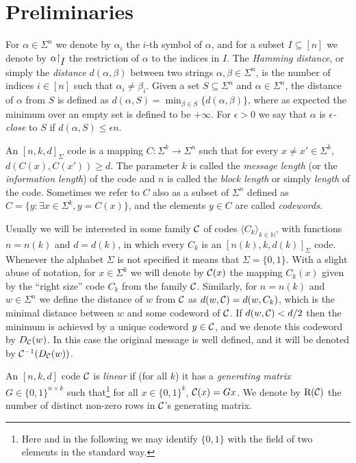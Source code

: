 \documentclass[10pt]{article}
\theoremstyle{definition}
\numberwithin{equation}{section}
\newcommand{\naturals}{{\mathbb N}}
\newcommand{\CC}{{\cal C}}
\newcommand{\zo}{{\{0,1\}}}
\newcommand{\DEC}{{D_{\cal C}}}
\newcommand{\drows}{{{\mathrm{R}} }}
\newcommand{\rst}[1]{\ensuremath{{\mathbin\upharpoonright}%
\raise-.9ex\hbox{$#1$}}}
\begin{document}
\section{Preliminaries}

For $\alpha \in \Sigma^n$ we denote by $\alpha_i$ the 
%
$i$-th 
symbol of $\alpha$, and for a subset $I \subseteq [n]$ we denote by $\alpha\rst{I}$ the restriction of $\alpha$ to the indices in $I$.
The \emph{Hamming distance}, or simply the \emph{distance} $d(\alpha,\beta)$ between two strings $\alpha,\beta \in \Sigma^n$, is the number of indices $i \in [n]$ such that
$\alpha_i \ne \beta_i$. Given a set $S \subseteq \Sigma^n$ and $\alpha \in \Sigma^n$, the distance of $\alpha$ from $S$ is defined as $d(\alpha,S) = \min_{\beta \in S} \{d(\alpha,\beta)\}$, where as expected the minimum over an empty set is defined to be $+\infty$. For $\epsilon >0$ we say that $\alpha$ is \emph{$\epsilon$-close} to $S$ if $d(\alpha,S) \leq \epsilon n$.

An $[n,k,d]_\Sigma$ code is a mapping $C:\Sigma^k \to \Sigma^n$ such that
for every $x \ne x' \in \Sigma^k$, $d(C(x),C(x')) \geq d$. The
parameter $k$ is called the \emph{message length} (or the
\emph{information length}) of the code and $n$ is called the
\emph{block length} or simply \emph{length} of the code. Sometimes we
refer to $C$ also as a subset of $\Sigma^n$ defined as $C = \{y:
\exists x \in \Sigma^k, y=C(x)\}$, and the elements $y \in C$ are called \emph{codewords}.

Usually we will be interested in some family $\CC$ of codes $\langle C_k \rangle_{k \in \naturals}$, with functions $n=n(k)$ and $d=d(k)$, in which every $C_k$ is an $[n(k),k,d(k)]_\Sigma$ code. Whenever the alphabet $\Sigma$ is not specified it means that $\Sigma = \zo$. With a slight abuse of notation, for $x \in \Sigma^k$ we will denote by $\CC(x)$ the mapping $C_k(x)$ given by the ``right size'' code $C_k$ from the family $\CC$.
Similarly, for $n=n(k)$ and $w \in \Sigma^n$ we define the distance of $w$ from $\CC$ as $d(w,\CC) = d(w,C_k)$, which is the minimal distance between $w$ and some codeword of $\CC$.
If $d(w,\CC) < d/2$ then the minimum is achieved by a unique codeword $y \in \CC$, and we denote this codeword by $\DEC(w)$.
In this case the original message is well defined, and it will be denoted by $\CC^{-1}(\DEC(w))$.

An $[n,k,d]$ code $\CC$ is \emph{linear} if (for all $k$) it has a \emph{generating matrix} $G \in \zo^{n \times k}$ such that\footnote{Here and in the following we may identify $\zo$ with the field of two elements in the standard way.} for all $x \in \zo^k$, $\CC(x) = Gx$. We denote by $\drows(\CC)$ the number of distinct non-zero rows in $\CC$'s generating
 matrix.
\end{document}
